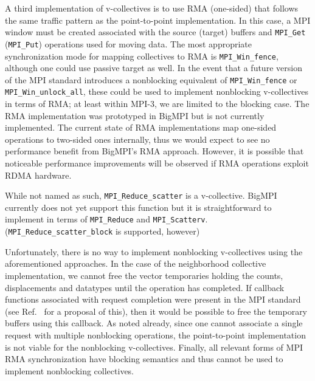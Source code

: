 A third implementation of v-collectives is to use RMA (one-sided) that follows
the same traffic pattern as the point-to-point implementation.
In this case, a MPI window must be created associated with the source (target)
buffers and \texttt{MPI\_Get} (\texttt{MPI\_Put}) operations used for moving data.
The most appropriate synchronization mode for mapping collectives to RMA
is \texttt{MPI\_Win\_fence}, although one could use passive target as well.
In the event that a future version of the MPI standard introduces a nonblocking
equivalent of \texttt{MPI\_Win\_fence} or \texttt{MPI\_Win\_unlock\_all}, these
could be used to implement nonblocking v-collectives in terms of RMA; 
at least within MPI-3, we are limited to the blocking case.
The RMA implementation was prototyped in BigMPI but is not currently implemented.
The current state of RMA implementations map one-sided operations to two-sided ones internally, thus we would expect to see no performance benefit from BigMPI's RMA approach.
However, it is possible that noticeable performance improvements will be
observed if RMA operations exploit RDMA hardware.

While not named as such, \texttt{MPI\_Reduce\_scatter} is a v-collective.
BigMPI currently does not yet support this function
but it is straightforward to implement in terms of  \texttt{MPI\_Reduce} and
\texttt{MPI\_Scatterv}. (\texttt{MPI\_Reduce\_scatter\_block} is supported, however)


Unfortunately, there is no way to implement nonblocking v-collectives using 
the aforementioned approaches.  In the case of the neighborhood collective
implementation, we cannot free the vector temporaries holding the counts,
displacements and datatypes until the operation has completed.
If callback functions associated with request completion were present in the
MPI standard (see Ref.~\cite{ticket26} for a proposal of this), then it would
be possible to free the temporary buffers using this callback.
As noted already, since one cannot associate a single request with multiple
nonblocking operations, the point-to-point implementation is not viable
for the nonblocking v-collectives.
Finally, all relevant forms of MPI RMA synchronization have blocking semantics
and thus cannot be used to implement nonblocking collectives.

